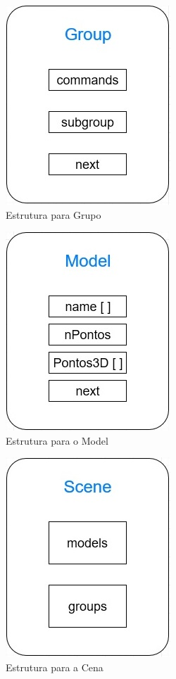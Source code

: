 \begin{figure}[htpb]
	\centering
	\includegraphics[scale=0.5]{imagens/structureGroup.jpg}
	\caption{Estrutura para Grupo}
	\label{p1:fig:p1_estruturagroup}
\end{figure}

\begin{figure}[htpb]
	\centering
	\includegraphics[scale=0.5]{imagens/structureModel.jpg}
	\caption{Estrutura para o Model}
	\label{p1:fig:p1_estruturamodel}
\end{figure}

\begin{figure}[htpb]
	\centering
	\includegraphics[scale=0.5]{imagens/structureScene.jpg}
	\caption{Estrutura para a Cena}
	\label{p1:fig:p1_estruturascene}
\end{figure}


